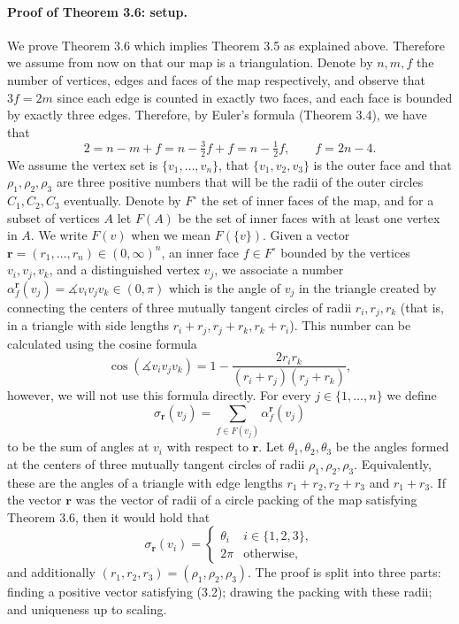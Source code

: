 \paragraph{Proof of Theorem 3.6: setup.}
We prove Theorem 3.6 which implies Theorem 3.5 as explained above. Therefore we assume from now on that our map is a triangulation. Denote by $n,m,f$ the number of vertices, edges and faces of the map respectively, and observe that $3f=2m$ since each edge is counted in exactly two faces, and each face is bounded by exactly three edges. Therefore, by Euler's formula (Theorem 3.4), we have that
\[
2=n-m+f=n-\tfrac32 f+f=n-\tfrac12f,\qquad f=2n-4.\tag{3.1}
\]
We assume the vertex set is $\{v_1,\ldots,v_n\}$, that $\{v_1,v_2,v_3\}$ is the outer face and that $\rho_1,\rho_2,\rho_3$ are three positive numbers that will be the radii of the outer circles $C_1,C_2,C_3$ eventually. Denote by $F^\circ$ the set of inner faces of the map, and for a subset of vertices $A$ let $F(A)$ be the set of inner faces with at least one vertex in $A$. We write $F(v)$ when we mean $F(\{v\})$.
Given a vector $\mathbf r=(r_1,\ldots,r_n)\in(0,\infty)^n$, an inner face $f\in F^\circ$ bounded by the vertices $v_i,v_j,v_k$, and a distinguished vertex $v_j$, we associate a number $\alpha_f^{\mathbf r}(v_j)=\measuredangle v_iv_jv_k\in(0,\pi)$ which is the angle of $v_j$ in the triangle created by connecting the centers of three mutually tangent circles of radii $r_i,r_j,r_k$ (that is, in a triangle with side lengths $r_i+r_j,r_j+r_k,r_k+r_i$). This number can be calculated using the cosine formula
\[
\cos(\measuredangle v_iv_jv_k)=1-\frac{2r_ir_k}{(r_i+r_j)(r_j+r_k)},
\]
however, we will not use this formula directly. For every $j\in\{1,\ldots,n\}$ we define
\[
\sigma_{\mathbf r}(v_j)=\sum_{f\in F(v_j)}\alpha_f^{\mathbf r}(v_j)
\]
to be the sum of angles at $v_i$ with respect to $\mathbf r$. Let $\theta_1,\theta_2,\theta_3$ be the angles formed at the centers of three mutually tangent circles of radii $\rho_1,\rho_2,\rho_3$. Equivalently, these are the angles of a triangle with edge lengths $r_1+r_2,r_2+r_3$ and $r_1+r_3$. If the vector $\mathbf r$ was the vector of radii of a circle packing of the map satisfying Theorem 3.6, then it would hold that
\[
\sigma_{\mathbf r}(v_i)=\begin{cases}\theta_i&i\in\{1,2,3\},\\2\pi&\text{otherwise},\end{cases}\tag{3.2}
\]
and additionally $(r_1,r_2,r_3)=(\rho_1,\rho_2,\rho_3)$. The proof is split into three parts: finding a positive vector satisfying (3.2); drawing the packing with these radii; and uniqueness up to scaling.

